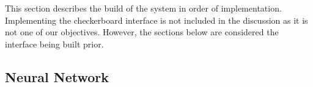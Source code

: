 \documentclass[12pt,a4paper]{article}
\newcommand{\bl}{\node [ball, ball color=black!80!white, draw=black!65!white, thin]{};}
\newcommand{\wh}{\node [ball, ball color=white] {};}
\begin{document}
 
    This section describes the build of the system in order of implementation. Implementing the checkerboard interface is not included in the discussion as it is not one of our objectives. However, the sections below are considered the interface being built prior. 

    \subsection{Neural Network}
\end{document}
